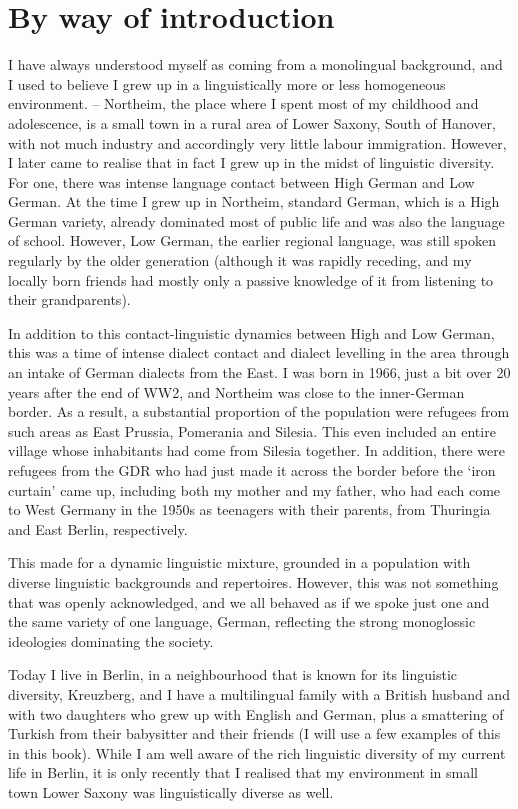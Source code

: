 \chapter{By way of introduction}
\label{chap:intro}

I have always understood myself as coming from a monolingual background, and I used to believe I grew up in a linguistically more or less homogeneous environment. – Northeim, the place where I spent most of my childhood and adolescence, is a small town in a rural area of Lower Saxony, South of Hanover, with not much industry and accordingly very little labour immigration. However, I later came to realise that in fact I grew up in the midst of linguistic diversity. For one, there was intense language contact between High German and Low German. At the time I grew up in Northeim, standard German, which is a High German variety, already dominated most of public life and was also the language of school. However, Low German, the earlier regional language, was still spoken regularly by the older generation (although it was rapidly receding, and my locally born friends had mostly only a passive knowledge of it from listening to their grandparents).

In addition to this contact-linguistic dynamics between High and Low German, this was a time of intense dialect contact and dialect levelling in the area through an intake of German dialects from the East. I was born in 1966, just a bit over 20 years after the end of WW2, and Northeim was close to the inner-German border. As a result, a substantial proportion of the population were refugees from such areas as East Prussia, Pomerania and Silesia. This even included an entire village whose inhabitants had come from Silesia together. In addition, there were refugees from the GDR who had just made it across the border before the ‘iron curtain’ came up, including both my mother and my father, who had each come to West Germany in the 1950s as teenagers with their parents, from Thuringia and East Berlin, respectively.

This made for a dynamic linguistic mixture, grounded in a population with diverse linguistic backgrounds and repertoires. However, this was not something that was openly acknowledged, and we all behaved as if we spoke just one and the same variety of one language, German, reflecting the strong monoglossic ideologies dominating the society.

Today I live in Berlin, in a neighbourhood that is known for its linguistic diversity, Kreuzberg, and I have a multilingual family with a British husband and with two daughters who grew up with English and German, plus a smattering of Turkish from their babysitter and their friends (I will use a few examples of this in this book). While I am well aware of the rich linguistic diversity of my current life in Berlin, it is only recently that I realised that my environment in small town Lower Saxony was linguistically diverse as well.

